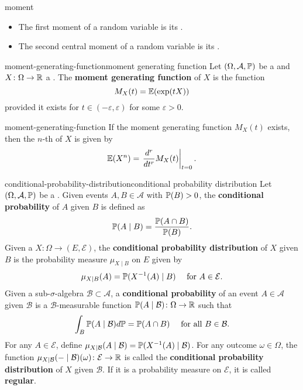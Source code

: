 \begin{example}{moment}
    \begin{itemize}
        \item The first moment of a random variable is its .
        \item The second central moment of a random variable is its .
    \end{itemize}
\end{example}

\begin{topic}{moment-generating-function}{moment generating function}
    Let $(\Omega, \mathcal{A}, \mathbb{P})$ be a  and $X \colon \Omega \to \mathbb{R}$ a . The \textbf{moment generating function} of $X$ is the function
    \[ M_X(t) = \mathbb{E}(\exp(t X)) \]
    provided it exists for $t \in (-\varepsilon, \varepsilon)$ for some $\varepsilon > 0$.
\end{topic}

\begin{example}{moment-generating-function}
    If the moment generating function $M_X(t)$ exists, then the $n$-th  of $X$ is given by 
    \[ \mathbb{E}(X^n) = \left. \frac{d^r}{dt^r} M_X(t) \right|_{t = 0} . \]
\end{example}

\begin{topic}{conditional-probability-distribution}{conditional probability distribution}
    Let $(\Omega, \mathcal{A}, \mathbb{P})$ be a . Given events $A, B \in \mathcal{A}$ with $\mathbb{P}(B) > 0$, the \textbf{conditional probability} of $A$ given $B$ is defined as
    \[ \mathbb{P}(A \mid B) = \frac{\mathbb{P}(A \cap B)}{\mathbb{P}(B)} . \]
    Given a  $X \colon \Omega \to (E, \mathcal{E})$, the \textbf{conditional probability distribution} of $X$ given $B$ is the probability measure $\mu_{X \mid B}$ on $E$ given by
    \[ \mu_{X \mid B}(A) = \mathbb{P}(X^{-1}(A) \mid B) \quad \textup{ for } A \in \mathcal{E} . \]
    Given a sub-$\sigma$-algebra $\mathcal{B} \subset \mathcal{A}$, a \textbf{conditional probability} of an event $A \in \mathcal{A}$ given $\mathcal{B}$ is a $\mathcal{B}$-measurable function $\mathbb{P}(A \mid \mathcal{B}) \colon \Omega \to \mathbb{R}$ such that
    \[ \int_B \mathbb{P}(A \mid \mathcal{B}) d \mathbb{P} = \mathbb{P}(A \cap B) \quad \textup{ for all } B \in \mathcal{B} . \]
    For any $A \in \mathcal{E}$, define $\mu_{X \mid \mathcal{B}}(A \mid \mathcal{B}) = \mathbb{P}(X^{-1}(A) \mid \mathcal{B})$. For any outcome $\omega \in \Omega$, the function $\mu_{X \mid \mathcal{B}}(- \mid \mathcal{B})(\omega) \colon \mathcal{E} \to \mathbb{R}$ is called the \textbf{conditional probability distribution} of $X$ given $\mathcal{B}$. If it is a probability measure on $\mathcal{E}$, it is called \textbf{regular}.
\end{topic}
